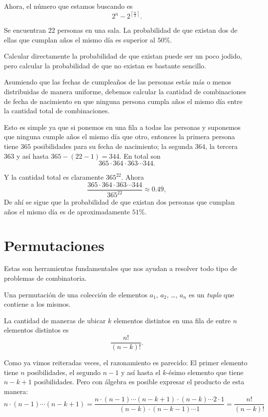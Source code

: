 Ahora, el número que estamos buscando es
\[2^n - 2^{\left\lceil\frac n2\right\rceil}.\]

\begin{example}
	Se encuentran $22$ personas en una sala.
	La probabilidad de que existan dos de ellas que
	cumplan años el mismo día es superior al $50\%$.
\end{example}

Calcular directamente la probabilidad de que
existan puede ser un poco jodido,
pero calcular la probabilidad de que
no existan es bastante sencillo.

Asumiendo que las fechas de cumpleaños de las personas
estás más o menos distribuidas de manera uniforme,
debemos calcular la cantidad de combinaciones
de fecha de nacimiento en que
ninguna persona cumpla años el mismo día entre
la cantidad total de combinaciones.

Esto es simple ya que si ponemos en una fila a
todas las personas y suponemos que ninguna cumple
años el mismo día que otro, entonces la primera
persona tiene $365$ posibilidades para su fecha de
nacimiento; la segunda $364$, la tercera $363$
y así hasta $365 - (22 - 1) = 344$.
En total son
\[365 \cdot 364 \cdot 363 \cdots 344.\]

Y la cantidad total es claramente $365^{22}$.
Ahora
\[\frac{365 \cdot 364 \cdot 363 \cdots 344}{365^{22}} \approx 0.49,\]
De ahí se sigue que la probabilidad de que existan
dos personas que cumplan años el mismo día
es de aproximadamente $51\%$.

\section{Permutaciones}
Estas son herramientas fundamentales que
nos ayudan a resolver todo tipo
de problemas de combinatoria.

\begin{definition}[Permutación]
	Una permutación de una colección
	de elementos $a_1$, $a_2$, \dots, $a_n$
	es un \textit{tuplo}\footnotemark
	que contiene a los mismos.

\end{definition}

\begin{example}
	La cantidad de maneras de ubicar $k$
	elementos distintos en una fila de entre
	$n$ elementos distintos es
	\[\frac{n!}{(n - k)!}.\]
\end{example}
Como ya vimos reiteradas veces, el razonamiento
es parecido:
El primer elemento tiene $n$ posibilidades,
el segundo $n - 1$ y así hasta
el $k$-ésimo elemento que tiene $n - k + 1$
posibilidades.
Pero con álgebra es posible expresar el
producto de esta manera:
\[n \cdot (n - 1) \cdots (n - k + 1) = \frac{n \cdot (n - 1) \cdots (n - k + 1) \cdot (n - k) \cdots 2 \cdot 1}{(n - k) \cdot (n - k - 1) \cdots 1} = \frac{n!}{(n - k)!}\]

